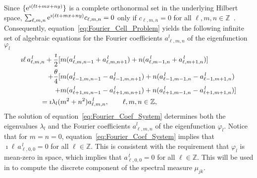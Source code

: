 \documentclass[amsa]{ipart}
\begin{document}
%
Since $\{\mathrm{e}^{\imath(\ell t+mx+ny)}\}$ is a complete orthonormal set in the
underlying Hilbert space, $\sum_{\ell,m,n} \mathrm{e}^{\imath(\ell t+mx+ny)}c_{\ell,m,n}=0$
only if $c_{\ell,m,n}=0$ for all $\ell,m,n\in\mathbb{Z}$~\cite{Stone:64}.
Consequently, equation~\eqref{eq:Fourier_Cell_Problem} yields the
following infinite set of algebraic equations for the Fourier
coefficients $a^l_{\ell,m,n}$ of the eigenfunction $\varphi_l$ 
%
\begin{align}\label{eq:Fourier_Coef_System}
\imath \ell\,a^{\,l}_{\ell,m,n}+\frac{\imath}{2}
[&m(a^{\,l}_{\ell,m,n-1}+a^{\,l}_{\ell,m,n+1})+n(a^{\,l}_{\ell,m-1,n}+a^{\,l}_{\ell,m+1,n})]
\\
+\frac{\theta}{4}[&m(a^{\,l}_{\ell-1,m,n-1}-a^{\,l}_{\ell-1,m,n+1})+n(a^{\,l}_{\ell-1,m-1,n}-a^{\,l}_{\ell-1,m+1,n})
\notag\\
+&m(a^{\,l}_{\ell+1,m,n-1}-a^{\,l}_{\ell+1,m,n+1})+n(a^{\,l}_{\ell+1,m-1,n}-a^{\,l}_{\ell+1,m+1,n})]
\notag\\
=\imath\lambda_l(&m^2+n^2)a^{\,l}_{\ell,m,n}, \qquad \ell,m,n\in\mathbb{Z},
\notag
\end{align}
%
The solution of equation~\eqref{eq:Fourier_Coef_System} determines
both the eigenvalues $\lambda_l$ and the Fourier coefficients $a^l_{\ell,m,n}$
of the eigenfunction $\varphi_l$. Notice that for $m=n=0$,
equation~\eqref{eq:Fourier_Coef_System} implies that
$\imath \ell\,a^{\,l}_{\ell,0,0}=0$ for all $\ell\in\mathbb{Z}$. This is consistent
with the requirement that $\varphi_l$ is mean-zero in space, which implies
that $a^{\,l}_{\ell,0,0}=0$ for all $\ell\in\mathbb{Z}$. This will be used in
 to compute the discrete component of the
spectral measure $\mu_{jk}$. 
\end{document}
